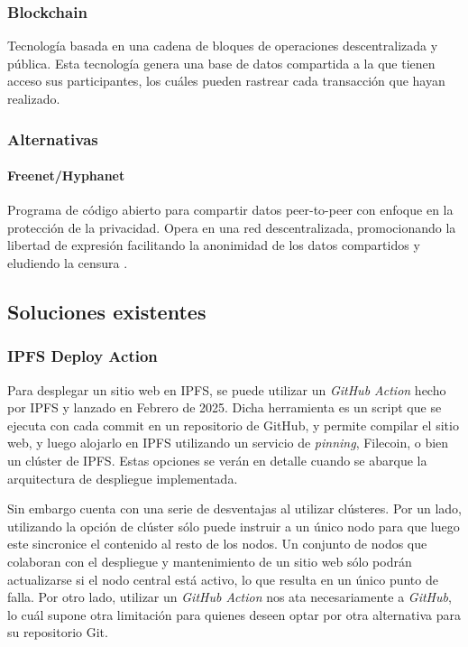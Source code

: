 \subsubsection{Blockchain}
Tecnología basada en una cadena de bloques de operaciones descentralizada y pública.  Esta tecnología genera una base de datos compartida a la que tienen acceso sus participantes, los cuáles pueden rastrear cada transacción que hayan realizado.\parencite{blockchain}


\subsubsection{Alternativas}
\paragraph{Freenet/Hyphanet}
Programa de código abierto para compartir datos peer-to-peer con enfoque en la protección de la privacidad. Opera en una red descentralizada, promocionando la libertad de expresión facilitando la anonimidad de los datos compartidos y eludiendo la censura \cite{freenet} \cite{hyphanet}.

\subsection{Soluciones existentes}

\subsubsection{IPFS Deploy Action}
Para desplegar un sitio web en IPFS, se puede utilizar un \textit{GitHub Action} hecho por IPFS y lanzado en Febrero de 2025. Dicha herramienta es un script que se ejecuta con cada commit en un repositorio de GitHub, y permite compilar el sitio web, y luego alojarlo en IPFS utilizando un servicio de \textit{pinning}, Filecoin, o bien un clúster de IPFS. Estas opciones se verán en detalle cuando se abarque la arquitectura de despliegue implementada.

Sin embargo cuenta con una serie de desventajas al utilizar clústeres. Por un lado, utilizando la opción de clúster sólo puede instruir a un único nodo para que luego este sincronice el contenido al resto de los nodos. Un conjunto de nodos que colaboran con el despliegue y mantenimiento de un sitio web sólo podrán actualizarse si el nodo central está activo, lo que resulta en un único punto de falla. Por otro lado, utilizar un \textit{GitHub Action} nos ata necesariamente a \textit{GitHub}, lo cuál supone otra limitación para quienes deseen optar por otra alternativa para su repositorio Git.

